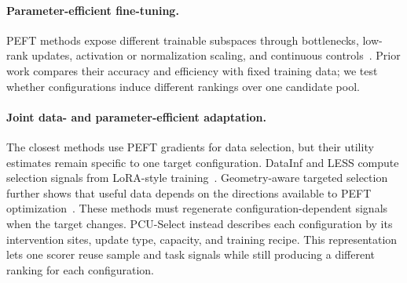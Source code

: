 \paragraph{Parameter-efficient fine-tuning.}
PEFT methods expose different trainable subspaces through bottlenecks, low-rank updates, activation or normalization scaling, and continuous controls~\cite{houlsby2019adapters,pfeiffer2020adapterfusion,hu2022lora,dettmers2023qlora,liu2022ia3,wang2022lntuning,li2021prefixtuning,lester2021prompttuning}. Prior work compares their accuracy and efficiency with fixed training data; we test whether configurations induce different rankings over one candidate pool.

\paragraph{Joint data- and parameter-efficient adaptation.}
The closest methods use PEFT gradients for data selection, but their utility estimates remain specific to one target configuration. DataInf and LESS compute selection signals from LoRA-style training~\cite{kwon2023datainf, xia2024less}. Geometry-aware targeted selection further shows that useful data depends on the directions available to PEFT optimization~\cite{min2026gist}. These methods must regenerate configuration-dependent signals when the target changes.
PCU-Select instead describes each configuration by its intervention sites, update type, capacity, and training recipe. This representation lets one scorer reuse sample and task signals while still producing a different ranking for each configuration.
